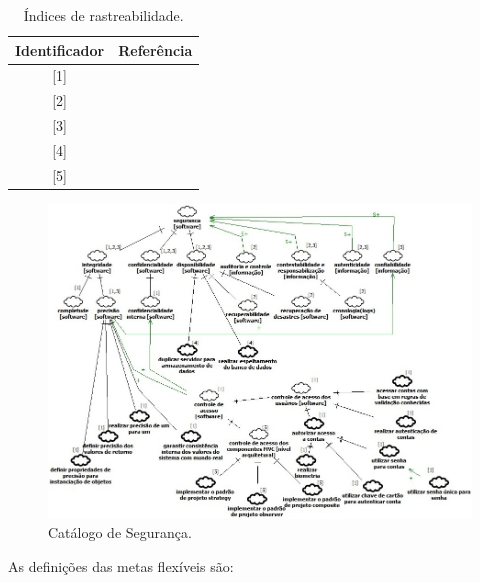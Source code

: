 \pagebreak

\begin{table}[h!]
	\centering
	\caption{Índices de rastreabilidade.}
	\label{indicesDeReferencia}
	\begin{tabular}{@{}cc@{}}
		\toprule
		\textbf{Identificador} & \textbf{Referência} \\ \midrule
		{[}1{]} & \cite{chung2012non} \\ 
		{[}2{]} & \cite{benitti2015taxonomia} \\
		{[}3{]} & \cite{documentation2005information} \\
		{[}4{]} & \cite{affleck2012supporting} \\
		{[}5{]} & \cite{buschmann1996system}
		\\ \bottomrule
	\end{tabular}
\end{table} 


\begin{figure}[h!]
	\centering
	\includegraphics[keepaspectratio=true,scale=0.7]{figuras/CatalogoDeSeguranca.JPG}
	\caption{Catálogo de Segurança.}
	\label{DetalhamentoPrimeiroNivel}
\end{figure}


As definições das metas flexíveis são: 

